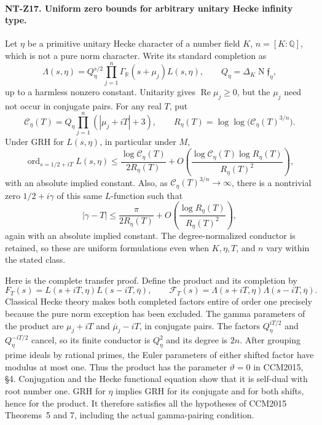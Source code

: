 \documentclass[11pt,a4paper]{article}
\begin{document}
\paragraph{NT-Z17. Uniform zero bounds for arbitrary unitary Hecke infinity type.}
Let $\eta$ be a primitive unitary Hecke character of a number field
$K$, $n=[K:\mathbb Q]$, which is not a pure norm character.
Write its standard completion as
\[
 \Lambda(s,\eta)=Q_\eta^{s/2}
         \prod_{j=1}^n\Gamma_{\mathbb R}(s+\mu_j)L(s,\eta),
 \qquad Q_\eta=\Delta_K\operatorname N\mathfrak f_\eta,
\]
up to a harmless nonzero constant.  Unitarity gives
$\operatorname{Re}\mu_j\ge0$, but the $\mu_j$ need not occur
in conjugate pairs.  For any real $T$, put
\[
 \mathscr C_\eta(T)=Q_\eta\prod_{j=1}^n(|\mu_j+iT|+3),
 \qquad
 R_\eta(T)=\log\log\bigl(\mathscr C_\eta(T)^{3/n}\bigr).
\]
Under GRH for $L(s,\eta)$, in particular under $M$,
\[
 \operatorname{ord}_{s=1/2+iT}L(s,\eta)
 \le\frac{\log\mathscr C_\eta(T)}{2R_\eta(T)}
  +O\left(\frac{\log\mathscr C_\eta(T)\log R_\eta(T)}
                 {R_\eta(T)^2}\right),
\tag{NT-Z17a}
\]
with an absolute implied constant.  Also, as
$\mathscr C_\eta(T)^{3/n}\to\infty$, there is a nontrivial zero
$1/2+i\gamma$ of this same $L$-function such that
\[
 |\gamma-T|\le\frac{\pi}{2R_\eta(T)}
                 +O\left(\frac{\log R_\eta(T)}{R_\eta(T)^2}\right),
\tag{NT-Z17b}
\]
again with an absolute implied constant.  The degree-normalized
conductor is retained, so these are uniform formulations even when
$K,\eta,T$, and $n$ vary within the stated class.

Here is the complete transfer proof.  Define the product and its
completion by
\[
 F_T(s)=L(s+iT,\eta)L(s-iT,\overline\eta),\qquad
 \mathcal F_T(s)=\Lambda(s+iT,\eta)
                         \Lambda(s-iT,\overline\eta).
\]
Classical Hecke theory makes both completed factors entire of order
one precisely because the pure norm exception has been excluded.
The gamma parameters of the product are
$\mu_j+iT$ and $\overline\mu_j-iT$, in conjugate pairs.
The factors $Q_\eta^{iT/2}$ and $Q_\eta^{-iT/2}$ cancel, so its
finite conductor is $Q_\eta^2$ and its degree is $2n$.
After grouping prime ideals by rational primes, the Euler parameters
of either shifted factor have modulus at most one.  Thus the product
has the parameter $\vartheta=0$ in CCM2015, \S4.  Conjugation and
the Hecke functional equation show that it is self-dual with root
number one.  GRH for $\eta$ implies GRH for its conjugate and for
both shifts, hence for the product.  It therefore satisfies all
the hypotheses of CCM2015 Theorems~5 and 7, including the actual
gamma-pairing condition.
\end{document}
